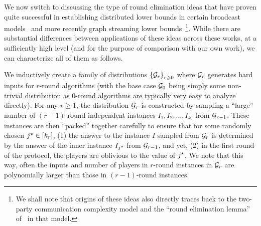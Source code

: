 \documentclass[11pt]{article}
\theoremstyle{definition}
\renewcommand{\geq}{\geqslant}
\newcommand{\set}[1]{\ensuremath{\left\{ #1 \right\}}}
\begin{document}
We now switch to discussing the type of round elimination ideas that have proven quite successful in establishing distributed lower bounds in certain broadcast models~\cite{AlonNRW15,AssadiKZ22} and more recently graph streaming lower bounds~\cite{AssadiKNS24,AssadiBKNS25}\footnote{We shall note that origins of these ideas also directly traces back to the two-party communication complexity model and the ``round elimination lemma'' of~\cite{MiltersenNSW95} in that model.}. While there are substantial differences between applications of these ideas across these works, at a sufficiently high level (and for the purpose of comparison with our own work), we can characterize all of them as follows. 

We inductively create a family of distributions $\set{\GG_r}_{r \geq 0}$ where $\mathcal{G}_r$ generates hard inputs for $r$-round algorithms (with the base case $\mathcal{G}_0$ being simply some non-trivial distribution as $0$-round algorithms 
are typically very easy to analyze directly). For any $r \geq 1$, the distribution $\mathcal{G}_r$ is constructed by sampling a ``large'' number of $(r-1)$-round independent instances $I_1,I_2,\ldots,I_{k_r}$ from $\mathcal{G}_{r-1}$. 
These instances are then ``packed'' together carefully to ensure that for some randomly chosen $j^{\star} \in [k_r]$, (1) the answer to the instance $I$ sampled from $\mathcal{G}_r$ is determined by the answer of the inner instance $I_{j^{\star}}$ from $\mathcal{G}_{r-1}$, and yet, (2) in the
first round of the protocol, the players are oblivious to the value of $j^{\star}$. We note that this way, often the inputs and number of players in $r$-round instances in $\mathcal{G}_r$ are polynomially larger than those in $(r-1)$-round instances. 
\end{document}
